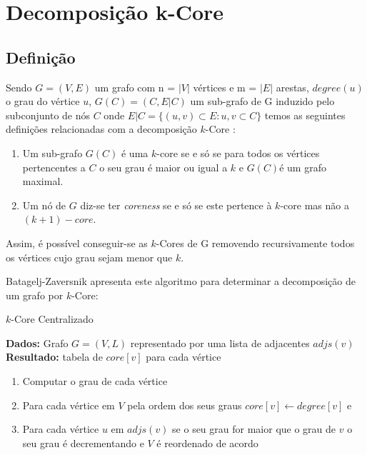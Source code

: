 \renewcommand{\algorithmicrequire}{\textbf{Dados: }}
\renewcommand{\algorithmicensure}{\textbf{Resultado: }}

\section{Decomposição k-Core}


\subsection{Definição}
Sendo $G = (V,E)$ um grafo com n = $|V|$ vértices e m = $|E|$ arestas, $degree(u)$ o grau do vértice $u$, $G(C) = (C, E|C)$ um sub-grafo de G induzido pelo subconjunto de nós $C$ onde $E|C = \{(u,v)\subset E : u,v \subset C\} $ temos as seguintes definições relacionadas com a decomposição $k$-Core \cite{kCoreDef}:

\begin{enumerate}
	\item Um sub-grafo $G(C)$ é uma $k$-core se e só se para todos os vértices pertencentes a $C$ o seu grau é maior ou igual a $k$ e $G(C)$é um grafo maximal.
	\item Um nó de $G$ diz-se ter \textit{coreness} se e só se este pertence à $k$-core mas não a $(k+1)-core$.
\end{enumerate}


Assim, é possível conseguir-se as $k$-Cores de G removendo recursivamente todos os vértices cujo grau sejam menor que $k$.

Batagelj-Zaversnik apresenta\cite{kCoreCen1} \cite{kCoreCen2} este algoritmo para determinar a decomposição de um grafo por $k$-Core:

\begin{algorithm}
\caption{$k$-Core Centralizado}
 \algorithmicrequire{Grafo $G = (V,L)$ representado por uma lista de adjacentes $adjs(v)$}
 \algorithmicensure{tabela de $core[v]$ para cada vértice}
\begin{enumerate}
	\item Computar o grau de cada vértice
	\item Para cada vértice em $V$ pela ordem dos seus graus $core[v] \gets degree[v]$ e
	\item Para cada vértice $u$ em $adjs(v)$ se o seu grau for maior que o grau de $v$ o seu grau é decrementando e $V$ é reordenado de acordo
\end{enumerate}
\end{algorithm}

